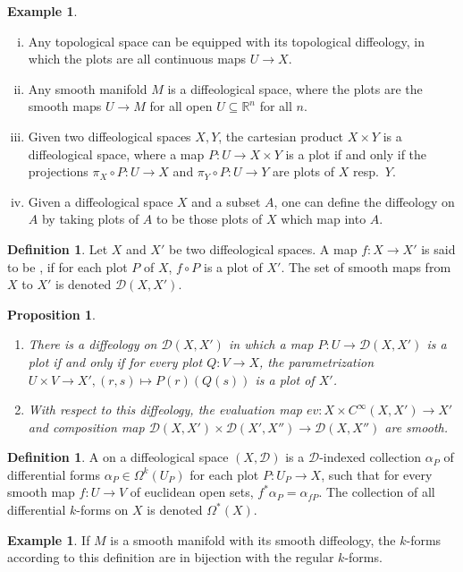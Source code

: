 \documentclass{scrartcl}
\let\emph\relax
\theoremstyle{plain}
\newtheorem{proposition}[theorem]{Proposition}
\theoremstyle{definition}
\newtheorem{definition}[theorem]{Definition}
\newtheorem{example}[theorem]{Example}
\newcommand{\R}{\mathbb R}
\renewcommand{\subset}{\subseteq}
\newcommand{\comp}{\mathbin{\circ}}
\begin{document}
\begin{example}\begin{enumerate}[(i)]
    \item Any topological space can be equipped with its topological diffeology, in which the plots are all continuous maps $U\to X$.
    \item Any smooth manifold $M$ is a diffeological space, where the plots are the smooth maps $U\to M$ for all open $U\subset\R^n$ for all $n$.
    \item Given two diffeological spaces $X, Y$, the cartesian product $X\times Y$ is a diffeological space, where a map $P\colon U\to X\times Y$ is a plot if and only if the projections $\pi_X \comp P \colon U\to X$ and $\pi_Y\comp P\colon U\to Y$ are plots of $X$ resp.\ $Y$.
    \item Given a diffeological space $X$ and a subset $A$, one can define the diffeology on $A$ by taking plots of $A$ to be those plots of $X$ which map into $A$.
\end{enumerate}\end{example}
\begin{definition}
    Let $X$ and $X'$ be two diffeological spaces. A map $f\colon X\to X'$ is said to be \emph{smooth}, if for each plot $P$ of $X$, $f\comp P$ is a plot of $X'$. The set of smooth maps from $X$ to $X'$ is denoted $\mathcal D(X, X')$.
\end{definition}
\begin{proposition}\label{prop:diffeology-mapping-space}
    \begin{enumerate}
        \item There is a diffeology on $\mathcal D(X, X')$ in which a map $P\colon U\to \mathcal D(X, X')$ is a plot if and only if for every plot $Q\colon V\to X$, the parametrization $U\times V\to X', (r,s)\mapsto P(r)(Q(s))$ is a plot of $X'$. 
    
        \item With respect to this diffeology, the evaluation map $ev\colon X\times C^\infty(X, X') \to X'$ and composition map $\mathcal D(X, X')\times \mathcal D(X', X'')\to \mathcal D(X, X'')$ are smooth.
    \end{enumerate}
\end{proposition}

\begin{definition}
    A \emph{differential $k$-form} on a diffeological space $(X,\mathcal D)$ is a $\mathcal D$-indexed collection $\alpha_P$ of differential forms $\alpha_P\in \Omega^k(U_P)$ for each plot $P\colon U_P\to X$, such that for every smooth map $f\colon U\to V$ of euclidean open sets, $f^*\alpha_P = \alpha_{fP}$. The collection of all differential $k$-forms on $X$ is denoted $\Omega^*(X)$.
\end{definition}
\begin{example}
If $M$ is a smooth manifold with its smooth diffeology, the $k$-forms according to this definition are in bijection with the regular $k$-forms. 
\end{example}
\end{document}
